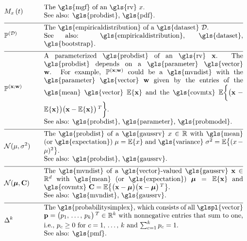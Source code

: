 \newpage
\begin{align} 
	&\mgf{x}{t} &\quad & \parbox{.85\textwidth}{The \gls{mgf} of an \gls{rv} $x$.
		\\ See also: \gls{probdist}, \gls{pdf}.} \nonumber \\[2mm] \hline \nonumber\\[-5mm]
	&\probdist^{(\dataset)} &\quad & \parbox{.85\textwidth}{The \gls{empiricaldistribution} of a \gls{dataset} $\dataset$.
		\\ See also: \gls{empiricaldistribution}, \gls{dataset}, \gls{bootstrap}.} \nonumber \\[2mm] \hline \nonumber\\[-5mm]
	&\probdist^{(\featurevec;\weights)} &\quad & \parbox{.85\textwidth}{A parameterized 
		\gls{probdist} of an \gls{rv} $\featurevec$. The \gls{probdist} depends on 
		a \gls{parameter} \gls{vector} $\weights$. For example, $\probdist^{(\featurevec;\weights)}$ 
		could be a \gls{mvndist} with the \gls{parameter} \gls{vector} $\weights$ given 
		by the entries of the \gls{mean} \gls{vector} $\expect \{ \featurevec \}$ 
		and the \gls{covmtx} $\expect \bigg \{ \big( \featurevec - \expect \{ \featurevec \}\big) \big( \featurevec - \expect \{ \featurevec \}\big)\,^{T}  \bigg\}$.
		\\ See also: \gls{probdist}, \gls{parameter}, \gls{probmodel}.} \nonumber \\[2mm] \hline \nonumber\\[-5mm]
	&\mathcal{N}(\mu, \sigma^{2}) &\quad & \parbox{.85\textwidth}{The \gls{probdist} of a 
		\gls{gaussrv} $\feature \in \mathbb{R}$ with \gls{mean} (or \gls{expectation}) $\mu= \expect \{ \feature \}$ 
		and \gls{variance} $\sigma^{2} =   \expect \big\{  (  \feature - \mu )^2 \big\}$.
		\\ See also: \gls{probdist}, \gls{gaussrv}.} \nonumber \\[2mm] \hline \nonumber\\[-5mm]
	&\mathcal{N}(\meanvecgeneric, \mathbf{C}) &\quad & \parbox{.85\textwidth}{The \gls{mvndist} of a \gls{vector}-valued 
		\gls{gaussrv} $\featurevec \in \mathbb{R}^{\featuredim}$ with \gls{mean} (or \gls{expectation}) $\meanvecgeneric= \expect \{ \featurevec \}$ 
		and \gls{covmtx} $\mathbf{C} =  \expect \big\{ \big( \featurevec - \meanvecgeneric \big)\big( \featurevec - \meanvecgeneric \big)\,^{T} \big\}$.
		\\ See also: \gls{mvndist}, \gls{gaussrv}.} \nonumber \\[2mm] \hline \nonumber\\[-5mm]  
	&\simplex{\nrcluster} &\quad & \parbox{.85\textwidth}{The \gls{probabilitysimplex}, which consists of all \glspl{vector} 
		$\vp = \big( p_{1}, \,\ldots, \,p_{\nrcluster} \big)\,^{T} \in \mathbb{R}^{\nrcluster}$ 
	        with nonnegative entries that sum to one, i.e., $p_{\clusteridx} \geq 0$ for $\clusteridx=1, \,\ldots, \,\nrcluster$ and
		$\sum_{\clusteridx=1}^{\nrcluster} p_{\clusteridx} = 1$.
		\\ See also: \gls{pmf}.}  \nonumber
\end{align} 


